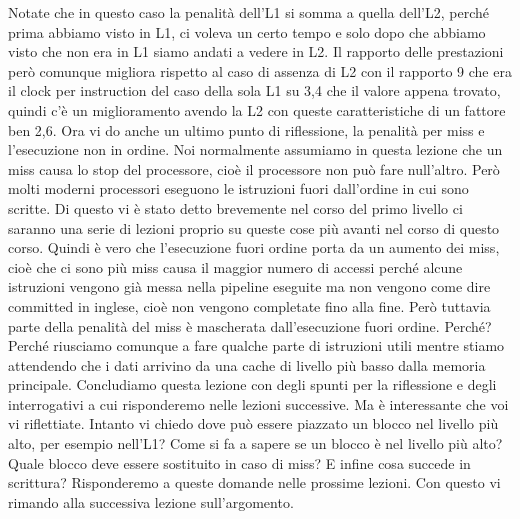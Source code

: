 Notate che in questo caso la penalità dell'L1 si somma a quella dell'L2, perché prima abbiamo visto in L1, ci voleva un certo tempo e solo dopo che abbiamo visto che non era in L1 siamo andati a vedere in L2.
Il rapporto delle prestazioni però comunque migliora rispetto al caso di assenza di L2 con il rapporto 9 che era il clock per instruction del caso della sola L1 su 3,4 che il valore appena trovato, quindi c'è un miglioramento avendo la L2 con queste caratteristiche di un fattore ben 2,6.
Ora vi do anche un ultimo punto di riflessione, la penalità per miss e l'esecuzione non in ordine.
Noi normalmente assumiamo in questa lezione che un miss causa lo stop del processore, cioè il processore non può fare null'altro.
Però molti moderni processori eseguono le istruzioni fuori dall'ordine in cui sono scritte.
Di questo vi è stato detto brevemente nel corso del primo livello ci saranno una serie di lezioni proprio su queste cose più avanti nel corso di questo corso.
Quindi è vero che l'esecuzione fuori ordine porta da un aumento dei miss, cioè che ci sono più miss causa il maggior numero di accessi perché alcune istruzioni vengono già messa nella pipeline eseguite ma non vengono come dire committed in inglese, cioè non vengono completate fino alla fine.
Però tuttavia parte della penalità del miss è mascherata dall'esecuzione fuori ordine.
Perché?
Perché riusciamo comunque a fare qualche parte di istruzioni utili mentre stiamo attendendo che i dati arrivino da una cache di livello più basso dalla memoria principale.
Concludiamo questa lezione con degli spunti per la riflessione e degli interrogativi a cui risponderemo nelle lezioni successive.
Ma è interessante che voi vi riflettiate.
Intanto vi chiedo dove può essere piazzato un blocco nel livello più alto, per esempio nell'L1?
Come si fa a sapere se un blocco è nel livello più alto?
Quale blocco deve essere sostituito in caso di miss?
E infine cosa succede in scrittura?
Risponderemo a queste domande nelle prossime lezioni.
Con questo vi rimando alla successiva lezione sull'argomento.